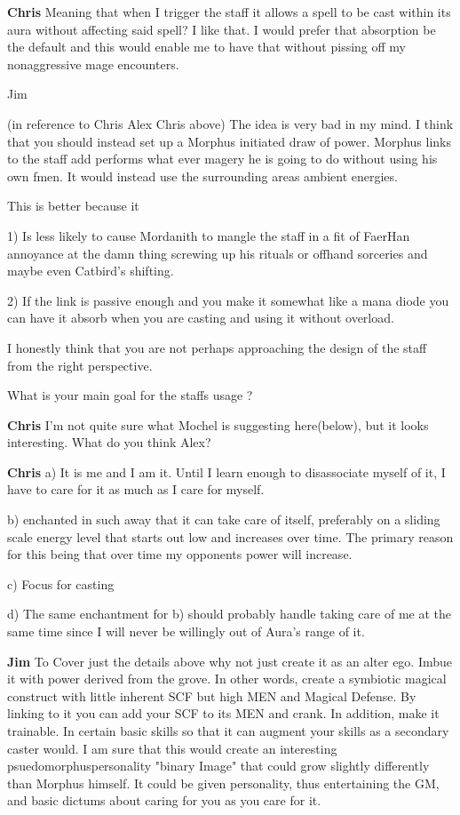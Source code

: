 {\bf Chris} 
Meaning that when I trigger the staff it allows a spell to be cast within 
its aura without affecting said spell? I like that. I would prefer that 
absorption be the default and this would enable me to have that 
without pissing off my non\-aggressive mage encounters.

Jim

(in reference to Chris Alex Chris above)
The idea is very bad in my mind. I think that you should instead set up 
a Morphus initiated draw of power. Morphus links to the staff add 
performs what ever magery he is going to do without using his own fmen. 
It would instead use the surrounding areas ambient energies.

This is better because it

1)	Is less likely to cause Mordanith to mangle the staff in a fit of Faer\-Han
annoyance at the damn thing screwing up his rituals or off\-hand sorceries and
maybe even Catbird's shifting. 

2)	If the link is passive enough and you make it somewhat like a mana diode you
can have it absorb when you are casting and using it without overload. 

I honestly think that you are not perhaps approaching the design of the staff 
from the right perspective. 

What is your main goal for the staffs usage ?

{\bf Chris} 
I'm not quite sure what Mochel is suggesting here(below), but 
it looks interesting. What do you think Alex?

{\bf Chris} 
a)	It is me and I am it. Until I learn enough to disassociate myself of it, 
I have to care for it as much as I care for myself.

b)	enchanted in such away that it can take care of itself, preferably on a 
sliding scale energy level that starts out low and increases over time. 
The primary reason for this being that over time my opponents power will 
increase.

c)	Focus for casting

d)	The same enchantment for b) should probably handle taking care of 
me at the same time since I will never be willingly out of Aura's range of 
it.

{\bf Jim}
To Cover just the details above why not just create it as an alter ego. 
Imbue it with power derived from the grove. In other words, create a symbiotic 
magical construct with little inherent SCF but high MEN and Magical Defense.
By linking to it you can add your SCF to its MEN and crank. In addition, 
make it trainable. In certain basic skills so that it can augment your skills 
as a secondary caster would. I am sure that this would create an interesting 
psuedo\-morphus\-personality "binary Image" that could grow slightly 
differently than Morphus himself. It could be given personality, 
thus entertaining the GM, and basic dictums about caring for you as 
you care for it.

